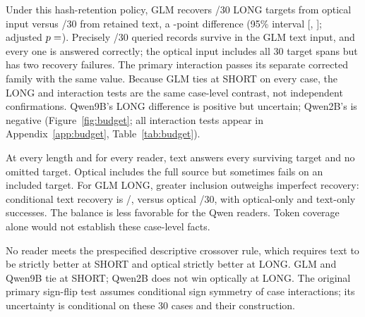 \documentclass{article}
\begin{document}
Under this hash-retention policy, GLM recovers /30 LONG targets from optical input versus /30 from retained text, a -point difference (95\% interval [, ]; adjusted $p=\nval{budget.GLM.secondary_long.holm}$). Precisely /30 queried records survive in the GLM text input, and every one is answered correctly; the optical input includes all 30 target spans but has two recovery failures. The primary interaction passes its separate corrected family with the same value. Because GLM ties at SHORT on every case, the LONG and interaction tests are the same case-level contrast, not independent confirmations. Qwen9B's LONG difference is positive but uncertain; Qwen2B's is negative (Figure~\ref{fig:budget}; all interaction tests appear in Appendix~\ref{app:budget}, Table~\ref{tab:budget}).

At every length and for every reader, text answers every surviving target and no omitted target. Optical includes the full source but sometimes fails on an included target. For GLM LONG, greater inclusion outweighs imperfect recovery: conditional text recovery is /, versus optical /30, with  optical-only and  text-only successes. The balance is less favorable for the Qwen readers. Token coverage alone would not establish these case-level facts.

No reader meets the prespecified descriptive crossover rule, which requires text to be strictly better at SHORT and optical strictly better at LONG. GLM and Qwen9B tie at SHORT; Qwen2B does not win optically at LONG. The original primary sign-flip test assumes conditional sign symmetry of case interactions; its uncertainty is conditional on these 30 cases and their construction.
\end{document}
